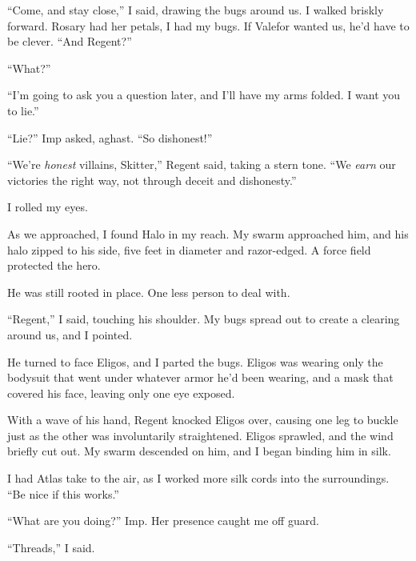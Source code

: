 ``Come, and stay close,'' I said, drawing the bugs around us.  I walked briskly forward.  Rosary had her petals, I had my bugs.  If Valefor wanted us, he'd have to be clever.  ``And Regent?''



``What?''



``I'm going to ask you a question later, and I'll have my arms folded.  I want you to lie.''



``Lie?'' Imp asked, aghast.  ``So dishonest!''



``We're \emph{honest} villains, Skitter,'' Regent said, taking a stern tone.  ``We \emph{ear}\emph{n} our victories the right way, not through deceit and dishonesty.''



I rolled my eyes.



As we approached, I found Halo in my reach.  My swarm approached him, and his halo zipped to his side, five feet in diameter and razor-edged.  A force field protected the hero.



He was still rooted in place.  One less person to deal with.



``Regent,'' I said, touching his shoulder.  My bugs spread out to create a clearing around us, and I pointed.



He turned to face Eligos, and I parted the bugs. Eligos was wearing only the bodysuit that went under whatever armor he'd been wearing, and a mask that covered his face, leaving only one eye exposed.



With a wave of his hand, Regent knocked Eligos over, causing one leg to buckle just as the other was involuntarily straightened.  Eligos sprawled, and the wind briefly cut out.  My swarm descended on him, and I began binding him in silk.



I had Atlas take to the air, as I worked more silk cords into the surroundings.  ``Be nice if this works.''



``What are you doing?''  Imp.  Her presence caught me off guard.



``Threads,'' I said.



